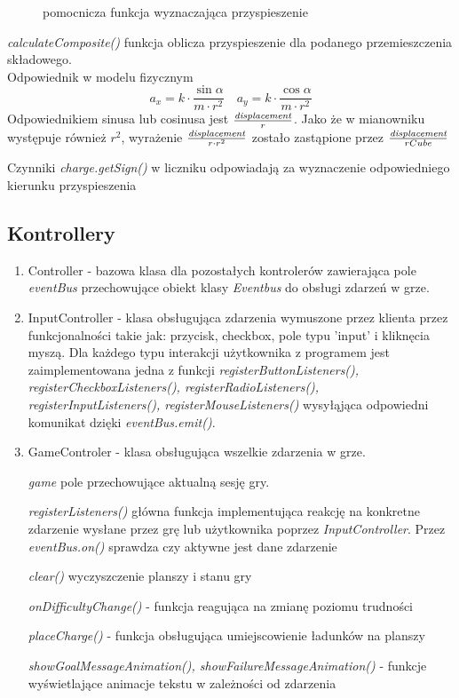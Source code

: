 \documentclass{article}
\begin{document}
\begin{enumerate}
\begin{figure}[h]
    \caption{pomocnicza funkcja wyznaczająca przyspieszenie}
    \label{fig:Funkcja_calculate_composite}
\end{figure}

\emph{calculateComposite()} funkcja oblicza przyspieszenie dla podanego przemieszczenia składowego. 
\\Odpowiednik w modelu fizycznym $$
a_{x}=k \cdot \frac{\sin \alpha}{m \cdot r^{2}} \quad a_{y}=k \cdot \frac{\cos \alpha}{m \cdot r^{2}}
$$
Odpowiednikiem sinusa lub cosinusa jest $\frac{\emph{displacement}}{r}$. Jako że w mianowniku występuje również $r^2$, wyrażenie $\frac{\emph{displacement}}{r \cdot r^2}$ zostało zastąpione przez $\frac{\emph{displacement}}{rCube}$

Czynniki \emph{charge.getSign()} w liczniku odpowiadają za wyznaczenie odpowiedniego kierunku przyspieszenia
    
    
\end{enumerate}

\subsection{Kontrollery}
\begin{enumerate}
    \item Controller - bazowa klasa dla pozostałych kontrolerów zawierająca pole \emph{eventBus} przechowujące obiekt klasy \emph{Eventbus} do obsługi zdarzeń w grze.
    
    \item InputController - klasa obsługująca zdarzenia wymuszone przez klienta przez funkcjonalności takie jak: przycisk, checkbox, pole typu 'input' i kliknęcia myszą. Dla każdego typu interakcji użytkownika z programem jest zaimplementowana jedna z funkcji \textit{registerButtonListeners(), registerCheckboxListeners(), registerRadioListeners(), registerInputListeners(), registerMouseListeners()} wysyłąjąca odpowiedni komunikat dzięki \emph{eventBus.emit()}.
    \item GameControler - klasa obsługująca wszelkie zdarzenia w grze.
    
    \emph{game} pole przechowujące aktualną sesję gry.
    
    \emph{registerListeners()} główna funkcja implementująca reakcję na konkretne zdarzenie wysłane przez grę lub użytkownika poprzez \emph{InputController}. Przez \emph{eventBus.on()} sprawdza czy aktywne jest dane zdarzenie
    
    \emph{clear()} wyczyszczenie planszy i stanu gry
    
    \emph{onDifficultyChange()} - funkcja reagująca na zmianę poziomu trudności
    
    \emph{placeCharge()} - funkcja obsługująca umiejscowienie ładunków na planszy
    
    \emph{showGoalMessageAnimation(), showFailureMessageAnimation()} - funkcje wyświetlające animacje tekstu w zależności od zdarzenia
    \end{enumerate}
\end{document}
